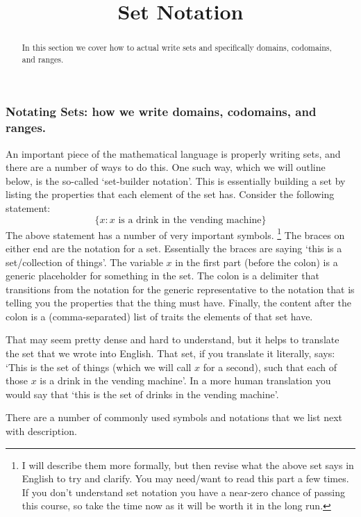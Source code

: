 \documentclass{ximera}
\title{Set Notation}
\begin{document}
\begin{abstract}
    In this section we cover how to actual write sets and specifically domains, codomains, and ranges.
\end{abstract}
\maketitle


\subsubsection*{Notating Sets: how we write domains, codomains, and ranges.}

    An important piece of the mathematical language is properly writing sets, and there are a number of ways to do this. One such way, which we will outline below, is the so-called `set-builder notation'. This is essentially building a set by listing the properties that each element of the set has. Consider the following statement:
    \[
        \{x : x \text{ is a drink in the vending machine} \}
    \]
    The above statement has a number of very important symbols.%
\footnote{%
    I will describe them more formally, but then revise what the above set says in English to try and clarify. You may need/want to read this part a few times. If you don't understand set notation you have a near-zero chance of passing this course, so take the time now as it will be worth it in the long run.
    }
    The braces on either end are the notation for a set. Essentially the braces are saying `this is a set/collection of things'. The variable $x$ in the first part (before the colon) is a generic placeholder for something in the set. The colon is a delimiter that transitions from the notation for the generic representative to the notation that is telling you the properties that the thing must have. Finally, the content after the colon is a (comma-separated) list of traits the elements of that set have.
    
    That may seem pretty dense and hard to understand, but it helps to translate the set that we wrote into English. That set, if you translate it literally, says: `This is the set of things (which we will call $x$ for a second), such that each of those $x$ is a drink in the vending machine'. In a more human translation you would say that `this is the set of drinks in the vending machine'.
    
    There are a number of commonly used symbols and notations that we list next with description. 
    
\end{document}
